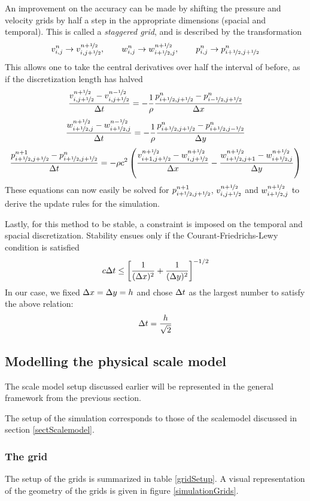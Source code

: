 An improvement on the accuracy can be made by shifting the pressure and velocity grids by half a step in the appropriate dimensions (spacial and temporal). This is called a \emph{staggered grid}\cite{staggered-grid}, and is described by the transformation
$$
v_{i,j}^n \to v_{i,j+\nicefrac{1}{2}}^{n+\nicefrac{1}{2}}
, \qquad
w_{i,j}^n \to w_{i+\nicefrac{1}{2},j}^{n+\nicefrac{1}{2}}
, \qquad
p_{i,j}^n \to p^n_{i+\nicefrac{1}{2}, j+\nicefrac{1}{2}}
$$
This allows one to take the central derivatives over half the interval of before, as if the discretization length has halved
$$
\frac{v_{i,j+\nicefrac{1}{2}}^{n+\nicefrac{1}{2}} - v_{i,j+\nicefrac{1}{2}}^{n-\nicefrac{1}{2}}}{\Delta t}
	= -\frac{1}{\rho} \frac{p^n_{i+\nicefrac{1}{2},j+\nicefrac{1}{2}} - p^n_{i-\nicefrac{1}{2},j+\nicefrac{1}{2}}}{\Delta x}
$$
$$
\frac{w_{i+\nicefrac{1}{2},j}^{n+\nicefrac{1}{2}} - w_{i+\nicefrac{1}{2},j}^{n-\nicefrac{1}{2}}}{\Delta t}
	= -\frac{1}{\rho} \frac{p^n_{i+\nicefrac{1}{2},j+\nicefrac{1}{2}} - p^n_{i+\nicefrac{1}{2},j-\nicefrac{1}{2}}}{\Delta y}
$$
$$
\frac{p_{i+\nicefrac{1}{2},j+\nicefrac{1}{2}}^{n+1} - p_{i+\nicefrac{1}{2},j+\nicefrac{1}{2}}^{n}}{\Delta t} = 
	-\rho c^2 \left(
		\frac{v_{i+1,j+\nicefrac{1}{2}}^{n+\nicefrac{1}{2}} 
			- w_{i,j+\nicefrac{1}{2}}^{n+\nicefrac{1}{2}}}{\Delta x}
		- \frac{w_{i+\nicefrac{1}{2},j+1}^{n+\nicefrac{1}{2}} 
			- w_{i+\nicefrac{1}{2},j}^{n+\nicefrac{1}{2}}}{\Delta y}
	\right)
$$
These equations can now easily be solved for $p^{n+1}_{i+\nicefrac{1}{2}, j+\nicefrac{1}{2}}$, $v_{i,j+\nicefrac{1}{2}}^{n+\nicefrac{1}{2}}$ and $w_{i+\nicefrac{1}{2},j}^{n+\nicefrac{1}{2}}$ to derive the update rules for the simulation.

Lastly, for this method to be stable, a constraint is imposed on the temporal and spacial discretization. Stability ensues only if the Courant-Friedrichs-Lewy condition is satisfied\cite{courant-friedrichs-lewy, numerical-stability-2D-FDTD}
$$
c\Delta t \leq \left[\frac{1}{(\Delta x)^2} + \frac{1}{(\Delta y)^2}\right] ^ {-1/2}
$$
In our case, we fixed $\Delta x = \Delta y = h$ and chose $\Delta t$ as the largest number to satisfy the above relation:
$$
\Delta t = \frac{h}{\sqrt{2}}
$$


\subsection{Modelling the physical scale model}
The scale model setup discussed earlier will be represented in the general framework from the previous section.

The setup of the simulation corresponds to those of the scalemodel discussed in section \ref{sectScalemodel}. 

\subsubsection*{The grid}
The setup of the grids is summarized in table \ref{gridSetup}. A visual representation of the geometry of the grids is given in figure \ref{simulationGrids}.

